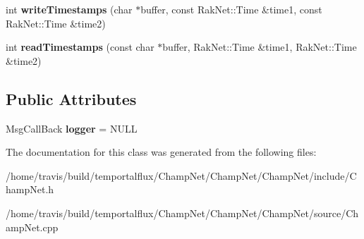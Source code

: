 \begin{DoxyCompactItemize}
\item 
\hypertarget{class_champ_net_1_1_network_af31e6a74b5354057bd01c95670e3c7a3}{int {\bfseries write\-Timestamps} (char $\ast$buffer, const Rak\-Net\-::\-Time \&time1, const Rak\-Net\-::\-Time \&time2)}\label{class_champ_net_1_1_network_af31e6a74b5354057bd01c95670e3c7a3}

\item 
\hypertarget{class_champ_net_1_1_network_ae298bf9276a935974c0b69bc5011f8dc}{int {\bfseries read\-Timestamps} (const char $\ast$buffer, Rak\-Net\-::\-Time \&time1, Rak\-Net\-::\-Time \&time2)}\label{class_champ_net_1_1_network_ae298bf9276a935974c0b69bc5011f8dc}

\end{DoxyCompactItemize}
\subsection*{Public Attributes}
\begin{DoxyCompactItemize}
\item 
\hypertarget{class_champ_net_1_1_network_a4588391c9f6064ad7fb83a08f0ea02c6}{Msg\-Call\-Back {\bfseries logger} = N\-U\-L\-L}\label{class_champ_net_1_1_network_a4588391c9f6064ad7fb83a08f0ea02c6}

\end{DoxyCompactItemize}


The documentation for this class was generated from the following files\-:\begin{DoxyCompactItemize}
\item 
/home/travis/build/temportalflux/\-Champ\-Net/\-Champ\-Net/\-Champ\-Net/include/Champ\-Net.\-h\item 
/home/travis/build/temportalflux/\-Champ\-Net/\-Champ\-Net/\-Champ\-Net/source/Champ\-Net.\-cpp\end{DoxyCompactItemize}
